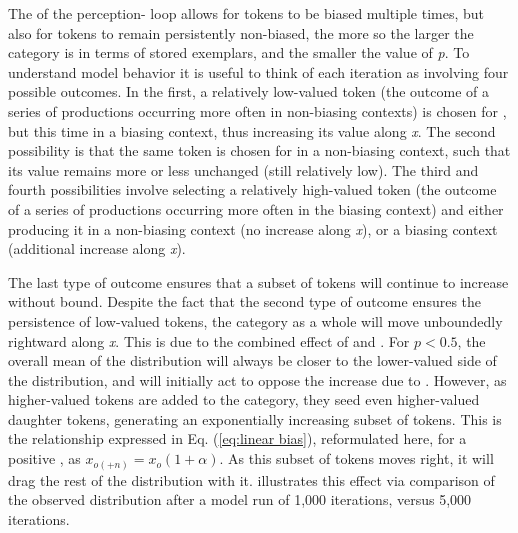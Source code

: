The  of the perception- loop allows for tokens
to be biased multiple times, but also for tokens to remain persistently
non-biased, the more so the larger the category is in terms of stored
exemplars, and the smaller the value of \emph{p}. To understand model
behavior it is useful to think of each iteration as involving four
possible outcomes. In the first, a relatively low-valued token (the
outcome of a series of productions occurring more often in non-biasing
contexts) is chosen for , but this time in a biasing context,
thus increasing its value along \emph{x}. The second possibility is
that the same token is chosen for  in a non-biasing context,
such that its value remains more or less unchanged (still relatively
low). The third and fourth possibilities involve selecting a relatively
high-valued token (the outcome of a series of productions occurring
more often in the biasing context) and either producing it in a non-biasing
context (no increase along \emph{x}), or a biasing context (additional
increase along \emph{x}). 

The last type of outcome ensures that a subset of tokens will continue
to increase without bound. Despite the fact that the second type of
outcome ensures the persistence of low-valued tokens, the category
as a whole will move unboundedly rightward along \emph{x}. This is
due to the combined effect of  and . For $p<0.5$,
the overall mean of the distribution will always be closer to the
lower-valued side of the distribution, and will initially act to oppose
the increase due to  . However, as higher-valued tokens
are added to the category, they seed even higher-valued daughter tokens,
generating an exponentially increasing subset of tokens. This is the
relationship expressed in Eq. (\ref{eq:linear bias}), reformulated
here, for a positive , as $x_{o(+n)}=x_{o}(1+\alpha)$. As this
subset of tokens moves right, it will drag the rest of the distribution
with it.  illustrates this effect
via comparison of the observed distribution after a model run of 1,000
iterations, versus 5,000 iterations.\largerpage

